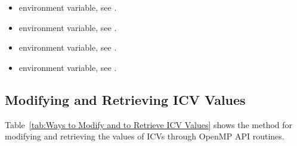 \begin{itemize}
\item {} environment variable, see .

\item {} environment variable, see .

\item {} environment variable, see .

\item {} environment variable, see .
\end{itemize}








\subsection{Modifying and Retrieving ICV Values}
\label{subsec:Modifying and Retrieving ICV Values}
Table~\ref{tab:Ways to Modify and to Retrieve ICV Values} shows the method for modifying and retrieving the values of ICVs
through OpenMP API routines.

